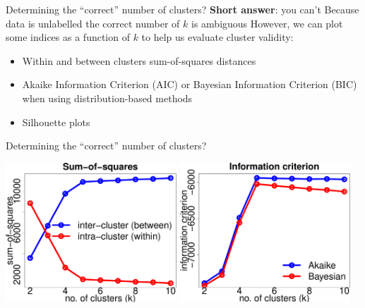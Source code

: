 \documentclass[pdf]{beamer}
\begin{document}
\begin{frame}{Determining the ``correct'' number of clusters?}
\textbf{Short answer}: you can't
\vfill
Because data is unlabelled the correct number of $k$ is ambiguous
\vfill
However, we can plot some indices as a function of $k$ to help us evaluate cluster validity:
\vfill
\begin{itemize}\addtolength{\itemsep}{0.8\baselineskip}
	\item Within and between clusters sum-of-squares distances
	\item Akaike Information Criterion (AIC) or Bayesian Information Criterion (BIC) when using distribution-based methods
	\item Silhouette plots %
\end{itemize}
\end{frame}
\begin{frame}{Determining the ``correct'' number of clusters?}
\begin{center}
	\includegraphics[width=0.48\textwidth]{sumOfSquares.pdf}\hfill	
	\includegraphics[width=0.48\textwidth]{infoCriterion.pdf}
\end{center}
\end{frame}
\end{document}
